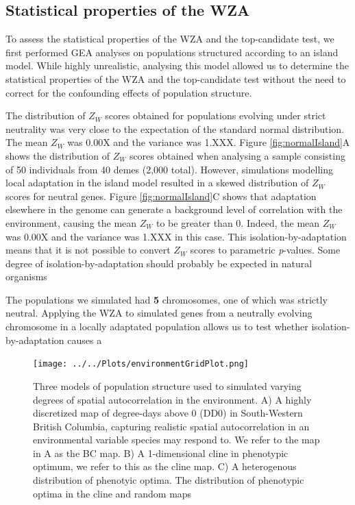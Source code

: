 \documentclass[11pt,twoside,lineno]{GSA_format}
\begin{document}
\subsection{Statistical properties of the WZA}

To assess the statistical properties of the WZA and the top-candidate test, we first performed GEA analyses on populations structured according to an island model. While highly unrealistic, analysing this model allowed us to determine the statistical properties of the WZA and the top-candidate test without the need to correct for the confounding effects of population structure. 

The distribution of $Z_W$ scores obtained for populations evolving under strict neutrality was very close to the expectation of the standard normal distribution. The mean $Z_W$ was 0.00X and the variance was 1.XXX. Figure \ref{fig:normalIsland}A shows the distribution of $Z_W$ scores obtained when analysing a sample consisting of 50 individuals from 40 demes (2,000 total).  However, simulations modelling local adaptation in the island model resulted in a skewed distribution of $Z_W$ scores for neutral genes. Figure \ref{fig:normalIsland}C shows that adaptation elsewhere in the genome can generate a background level of correlation with the environment, causing the mean $Z_W$ to be greater than 0. Indeed, the mean $Z_W$ was 0.00X and the variance was 1.XXX in this case. This isolation-by-adaptation means that it is not possible to convert $Z_W$ scores to parametric \textit{p}-values. 
Some degree of isolation-by-adaptation should probably be expected in natural organisms

The populations we simulated had \textbf{5} chromosomes, one of which was strictly neutral. Applying the WZA to simulated genes from a neutrally evolving chromosome in a locally adaptated population allows us to test whether isolation-by-adaptation causes a 

\begin{figure}
  \texttt{[image: ../../Plots/environmentGridPlot.png]}
  \caption{Three models of population structure used to simulated varying degrees of spatial autocorrelation in the environment. A) A highly discretized map of degree-days above 0 (DD0) in South-Western British Columbia, capturing realistic spatial autocorrelation in an environmental variable species may respond to. We refer to the map in A as the BC map. B) A 1-dimensional cline in phenotypic optimum, we refer to this as the cline map. C) A heterogenous distribution of phenotyic optima. The distribution of phenotypic optima in the cline and random maps}
  
  \label{fig:boat1}
\end{figure}
\end{document}
